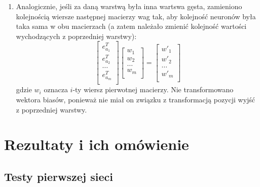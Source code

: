 \documentclass[12pt]{article}
\begin{document}
\begin{enumerate}
\begin{enumerate}
		\item Analogicznie, jeśli za daną warstwą była inna wartswa gęsta, zamieniono kolejnością wiersze następnej macierzy wag tak, aby kolejność neuronów była taka sama w obu macierzach (a zatem należało zmienić kolejność wartości wychodzących z poprzedniej warstwy):
		$$\begin{bmatrix}
			e_{a_1}^T\\ e_{a_2}^T\\ \dots\\ e_{a_m}^T\\
		\end{bmatrix}
		\begin{bmatrix}
			w_1\\ w_2\\ \dots\\ w_m\\
		\end{bmatrix}
		=
		\begin{bmatrix}
			w'_1\\ w'_2\\ \dots\\ w'_m\\
		\end{bmatrix}
		$$ gdzie $w_i$ oznacza $i$-ty wiersz pierwotnej macierzy. Nie transformowano wektora biasów, ponieważ nie miał on związku z transformacją pozycji wyjść z poprzedniej warstwy.
	\end{enumerate}
\end{enumerate}
\section{Rezultaty i ich omówienie}
\subsection{Testy pierwszej sieci}
\end{document}

